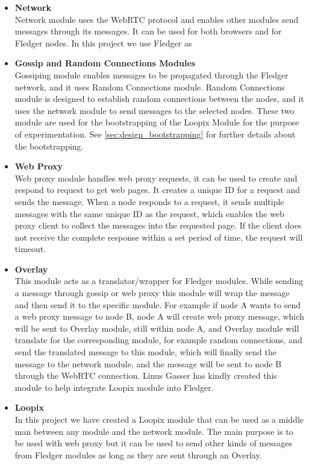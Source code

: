 \documentclass[a4paper,11pt,oneside]{report}
\begin{document}
\begin{itemize}
    \item \textbf{Network}\\
    Network module uses the WebRTC protocol and enables other modules send messages through its messages. It can be used for both browsers and for Fledger nodes. In this project we use Fledger as 
    \item \textbf{Gossip and Random Connections Modules} \\
    Gossiping module enables messages to be propagated through the Fledger network, and it uses Random Connections module. Random Connections module is designed to establish random connections between the nodes, and it uses the network module to send messages to the selected nodes. These two module are used for the bootstrapping of the Loopix Module for the purpose of experimentation. See \autoref{sec:design_bootstrapping} for further details about the bootstrapping.
    \item \textbf{Web Proxy}\\
    Web proxy module handles web proxy requests, it can be used to create and respond to request to get web pages. It creates a unique ID for a request and sends the message. When a node responds to a request, it sends multiple messages with the same unique ID as the request, which enables the web proxy client to collect the messages into the requested page. If the client does not receive the complete response within a set period of time, the request will timeout.
    \item \textbf{Overlay}\\
    This module acts as a translator/wrapper for Fledger modules. While sending a message through gossip or web proxy this module will wrap the message and then send it to the specific module. For example if node A wants to send a web proxy message to node B, node A will create web proxy message, which will be sent to Overlay module, still within node A, and Overlay module will translate for the corresponding module, for example random connections, and send the translated message to this module, which will finally send the message to the network module, and the message will be sent to node B through the WebRTC connection. Linus Gasser has kindly created this module to help integrate Loopix module into Fledger.
    \item \textbf{Loopix}\\
    In this project we have created a Loopix module that can be used as a middle man between any module and the network module. The main purpose is to be used with web proxy but it can be used to send other kinds of messages from Fledger modules as long as they are sent through an Overlay.
\end{itemize}
\end{document}
